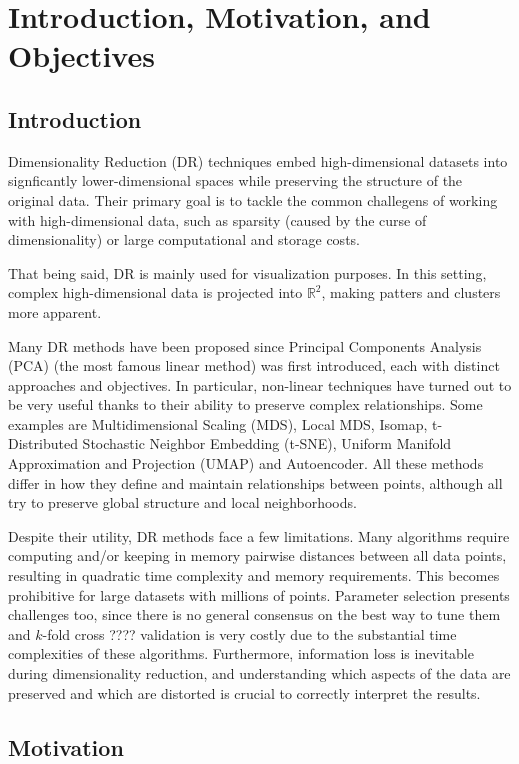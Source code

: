 \section{Introduction, Motivation, and Objectives}

\subsection{Introduction}

Dimensionality Reduction (DR) techniques embed high-dimensional datasets into signficantly lower-dimensional spaces while preserving the structure of the original data. Their primary goal is to tackle the common challegens of working with high-dimensional data, such as sparsity (caused by the curse of dimensionality) or large computational and storage costs.

That being said, DR is mainly used for visualization purposes. In this setting, complex high-dimensional data is projected into $\mathbb{R}^2$, making patters and clusters more apparent.

Many DR methods have been proposed since Principal Components Analysis (PCA) (the most famous linear method) was first introduced, each with distinct approaches and objectives. In particular, non-linear techniques have turned out to be very useful thanks to their ability to preserve complex relationships. Some examples are Multidimensional Scaling (MDS), Local MDS, Isomap, t-Distributed Stochastic Neighbor Embedding (t-SNE), Uniform Manifold Approximation and Projection (UMAP) and Autoencoder. All these methods differ in how they define and maintain relationships between points, although all try to preserve global structure and local neighborhoods.

Despite their utility, DR methods face a few limitations. Many algorithms require computing and/or keeping in memory pairwise distances between all data points, resulting in quadratic time complexity and memory requirements. This becomes prohibitive for large datasets with millions of points. Parameter selection presents challenges too, since there is no general consensus on the best way to tune them and $k$-fold cross ???? validation is very costly due to the substantial time complexities of these algorithms. Furthermore, information loss is inevitable during dimensionality reduction, and understanding which aspects of the data are preserved and which are distorted is crucial to correctly interpret the results.

\subsection{Motivation}

